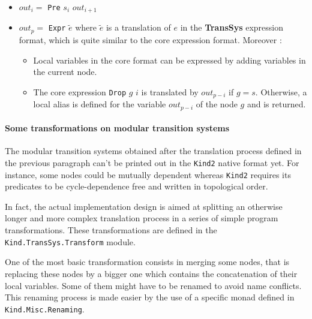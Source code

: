 \begin{itemize}
\item $out_{i} = $  \texttt{Pre} $s_i$  $out_{i + 1}$
\item $out_{p} = $  \texttt{Expr} $\tilde e$  where $\tilde e$ is a translation of $e$ in the \textbf{TransSys} expression format, which is quite similar to the core expression format. Moreover :

\begin{itemize}
\item Local variables in the core format can be expressed by adding variables in the current node.
\item The core expression \texttt{Drop} $g$ $i$ is translated by $out_{p - i}$ if $g = s$. Otherwise, a local alias is defined for the variable $out_{p - i}$ of the node $g$ and is returned.
\end{itemize}

\end{itemize}

\paragraph{Some transformations on modular transition systems} 

The modular transition systems obtained after the translation process defined in the previous paragraph can't be printed out in the \texttt{Kind2} native format yet. For instance, some nodes could be mutually dependent whereas \texttt{Kind2} requires its predicates to be cycle-dependence free and written in topological order.


In fact, the actual implementation design is aimed at splitting an otherwise longer and more complex translation process in a series of simple program transformations. These transformations are defined in the \texttt{Kind.TransSys.Transform} module.

\bigskip

One of the most basic transformation consists in merging some nodes, that is replacing these nodes by a bigger one which contains the concatenation of their local variables. Some of them might have to be renamed to avoid name conflicts. This renaming process is made easier by the use of a specific monad defined in \texttt{Kind.Misc.Renaming}.

